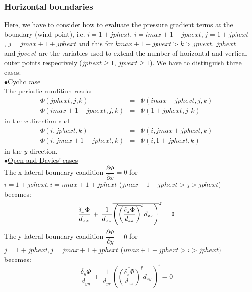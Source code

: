 \subsubsection {Horizontal boundaries}
Here, we have to consider how to evaluate the pressure gradient terms at the
boundary (wind point), i.e. $i = 1+jphext$, $i= imax+1+jphext$, $j = 1+jphext$,
$j = jmax+1+jphext$ and this for $kmax+1+jpvext > k > jpvext$. $jphext$ and
$jpvext$ are the variables used to extend the number of horizontal and vertical
outer points respectively ($jphext \geq 1$, $jpvext \geq 1$). We have to
distinguish three cases:\\
$\bullet$\underline{Cyclic case}\\
The periodic condition reads:\\
\begin{eqnarray}
\label{cyclic1}
 \Phi (jphext, j, k) &=& \Phi (imax+jphext, j, k) \\
\nonumber
\Phi (imax+1+jphext, j, k) &=& \Phi (1+jphext, j, k)
\end{eqnarray}
 in the $x$ direction and
\begin{eqnarray}
\label{cyclic2}
 \Phi (i, jphext, k) &=& \Phi (i, jmax+jphext, k) \\
\nonumber
\Phi (i, jmax+1+jphext, k) &=& \Phi (i, 1+jphext, k)
\end{eqnarray}
in the $y$ direction.\\
$\bullet$\underline{Open and Davies' cases}\\
The x lateral boundary condition $\dfrac{\partial{\Phi } } {\partial{x} } = 0
$ for $i = 1+jphext, i= imax+1+jphext$ ($jmax+1+jphext>j>jphext$) becomes:
\begin{equation}
\label{open1}
\dfrac{\delta_{x} \Phi}{d_{xx}}  \, +  \,  \dfrac{1}{d_{xx}}
\overline{ \left(\overline{ \left(\dfrac{\delta_{z} \Phi}{d_{zz}}
\right)}^{x}d_{zx}\right)}^{z} = 0
\nonumber \\
\end{equation}
The y lateral boundary condition $\dfrac{\partial{\Phi } } {\partial{y} } = 0 $
for $j = 1+jphext, j= jmax+1+jphext$ ($imax+1+jphext>i>jphext$)
becomes:
\begin{equation}
\label{open2}
 \dfrac{\delta_{y} \Phi}{d_{yy}}  \, + \,   \dfrac{1}{d_{yy}}
\overline{ \left(\overline{ \left(\dfrac{\delta_{z} \Phi}{d_{zz}}
\right)}^{y}d_{zy}\right)}^{z} = 0
\end{equation}
